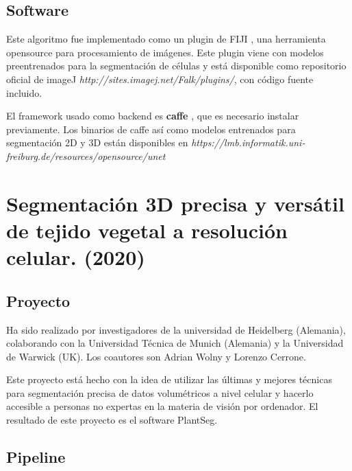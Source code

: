 \subsection{Software}\label{app1_software}

Este algoritmo fue implementado como un plugin de FIJI \cite{Schindelin2012}, una herramienta opensource para procesamiento de imágenes. Este plugin viene con modelos preentrenados para la segmentación de células y está disponible como repositorio oficial de imageJ \textit{http://sites.imagej.net/Falk/plugins/}, con código fuente incluido.

El framework usado como backend es \textbf{caffe} \cite{Jia2014}, que es necesario instalar previamente. Los binarios de caffe así como modelos entrenados para segmentación 2D y 3D están disponibles en \textit{https://lmb.informatik.uni-freiburg.de/resources/opensource/unet}

\section{Segmentación 3D precisa y versátil de tejido vegetal a resolución celular. (2020)}\label{sec:app2}


\subsection{Proyecto}\label{app2_proyect}

Ha sido realizado por investigadores de la universidad de Heidelberg (Alemania), colaborando con la Universidad Técnica de Munich (Alemania) y la Universidad de Warwick (UK). Los coautores son Adrian Wolny y Lorenzo Cerrone.\cite{Wolny2020}

Este proyecto está hecho con la idea de utilizar las últimas y mejores técnicas para segmentación precisa de datos volumétricos a nivel celular y hacerlo accesible a personas no expertas en la materia de visión por ordenador. El resultado de este proyecto es el software PlantSeg.

\subsection{Pipeline}\label{app2_pipeline}

